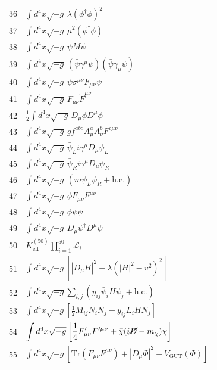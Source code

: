 \documentclass[12pt,a4paper]{article}
\begin{document}
\begin{longtable}{r p{}}
		36 & \(\displaystyle \int d^4x\sqrt{-g}\,\lambda(\phi^\dagger\phi)^2\) \\
		37 & \(\displaystyle \int d^4x\sqrt{-g}\,\mu^2(\phi^\dagger\phi)\) \\
		38 & \(\displaystyle \int d^4x\sqrt{-g}\,\bar\psi M\psi\) \\
		39 & \(\displaystyle \int d^4x\sqrt{-g}\,(\bar\psi\gamma^\mu\psi)(\bar\psi\gamma_\mu\psi)\) \\
		40 & \(\displaystyle \int d^4x\sqrt{-g}\,\bar\psi\sigma^{\mu\nu}F_{\mu\nu}\psi\) \\
		41 & \(\displaystyle \int d^4x\sqrt{-g}\,F_{\mu\nu}\tilde{F}^{\mu\nu}\) \\
		42 & \(\displaystyle \frac12\int d^4x\sqrt{-g}\,D_\mu\phi D^\mu\phi\) \\
		43 & \(\displaystyle \int d^4x\sqrt{-g}\,g f^{abc}A^a_\mu A^b_\nu F^{c\mu\nu}\) \\
		44 & \(\displaystyle \int d^4x\sqrt{-g}\,\bar\psi_L i\gamma^\mu D_\mu\psi_L\) \\
		45 & \(\displaystyle \int d^4x\sqrt{-g}\,\bar\psi_R i\gamma^\mu D_\mu\psi_R\) \\
		46 & \(\displaystyle \int d^4x\sqrt{-g}\,(m\bar\psi_L\psi_R + \text{h.c.})\) \\
		47 & \(\displaystyle \int d^4x\sqrt{-g}\,\phi F_{\mu\nu}F^{\mu\nu}\) \\
		48 & \(\displaystyle \int d^4x\sqrt{-g}\,\phi\bar\psi\psi\) \\
		49 & \(\displaystyle \int d^4x\sqrt{-g}\,D_\mu\psi^\dagger D^\mu\psi\) \\
		50 & \(\displaystyle K^{(50)}_{\mathrm{eff}}\prod_{i=1}^{50}\mathcal{L}_i\) \\
		51 & \(\displaystyle \int d^4x\sqrt{-g}\left[|D_\mu H|^2 - \lambda(|H|^2 - v^2)^2\right]\) \\
		52 & \(\displaystyle \int d^4x\sqrt{-g}\sum_{i,j}\left(y_{ij}\bar\psi_i H\psi_j + \text{h.c.}\right)\) \\
		53 & \(\displaystyle \int d^4x\sqrt{-g}\left[\frac12 M_{ij}N_i N_j + y_{ij}L_i H N_j\right]\) \\
		54 & \(\displaystyle \int d^4x\sqrt{-g}\left[\frac14 F'_{\mu\nu}F'^{\mu\nu} + \bar\chi(i\cancel{D} - m_\chi)\chi\right]\) \\
		55 & \(\displaystyle \int d^4x\sqrt{-g}\left[\mathrm{Tr}(F_{\mu\nu}F^{\mu\nu}) + |D_\mu\Phi|^2 - V_{\text{GUT}}(\Phi)\right]\) \\

\end{longtable}
\end{document}
